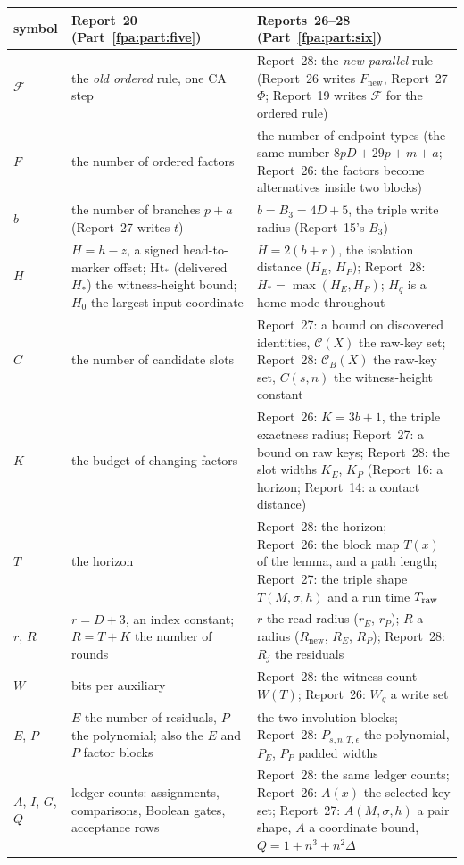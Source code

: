 \documentclass[11pt,a4paper]{article}
\numberwithin{equation}{section}
\begin{document}
\begin{center}
\small
\begin{longtable}{@{}p{}p{}p{}@{}}
\toprule
symbol & Report~20 (Part~\ref{fpa:part:five}) & Reports~26--28 (Part~\ref{fpa:part:six})\\
\midrule
\endhead
$\mathcal F$ & the \emph{old ordered} rule, one CA step & Report~28: the \emph{new parallel} rule (Report~26 writes $F_{\mathrm{new}}$, Report~27 $\Phi$; Report~19 writes $\mathcal F$ for the ordered rule)\\
$F$ & the number of ordered factors & the number of endpoint types (the same number $8pD+29p+m+a$; Report~26: the factors become alternatives inside two blocks)\\
$b$ & the number of branches $p+a$ (Report~27 writes $t$) & $b=B_3=4D+5$, the triple write radius (Report~15's $B_3$)\\
$H$ & $H=h-z$, a signed head-to-marker offset; $\mathrm{Ht}_*$ (delivered $H_*$) the witness-height bound; $H_0$ the largest input coordinate & $H=2(b+r)$, the isolation distance ($H_E$, $H_P$); Report~28: $H_*=\max(H_E,H_P)$; $H_q$ is a home mode throughout\\
$C$ & the number of candidate slots & Report~27: a bound on discovered identities, $\mathcal C(X)$ the raw-key set; Report~28: $\mathcal C_B(X)$ the raw-key set, $C(s,n)$ the witness-height constant\\
$K$ & the budget of changing factors & Report~26: $K=3b+1$, the triple exactness radius; Report~27: a bound on raw keys; Report~28: the slot widths $K_E$, $K_P$ (Report~16: a horizon; Report~14: a contact distance)\\
$T$ & the horizon & Report~28: the horizon; Report~26: the block map $T(x)$ of the lemma, and a path length; Report~27: the triple shape $T(M,\sigma,h)$ and a run time $T_{\rm raw}$\\
$r$, $R$ & $r=D+3$, an index constant; $R=T+K$ the number of rounds & $r$ the read radius ($r_E$, $r_P$); $R$ a radius ($R_{\mathrm{new}}$, $R_E$, $R_P$); Report~28: $R_j$ the residuals\\
$W$ & bits per auxiliary & Report~28: the witness count $W(T)$; Report~26: $W_g$ a write set\\
$E$, $P$ & $E$ the number of residuals, $P$ the polynomial; also the $E$ and $P$ factor blocks & the two involution blocks; Report~28: $P_{s,n,T,\epsilon}$ the polynomial, $P_E$, $P_P$ padded widths\\
$A$, $I$, $G$, $Q$ & ledger counts: assignments, comparisons, Boolean gates, acceptance rows & Report~28: the same ledger counts; Report~26: $A(x)$ the selected-key set; Report~27: $A(M,\sigma,h)$ a pair shape, $A$ a coordinate bound, $Q=1+n^3+n^2\Delta$\\

\end{longtable}
\end{center}
\end{document}
